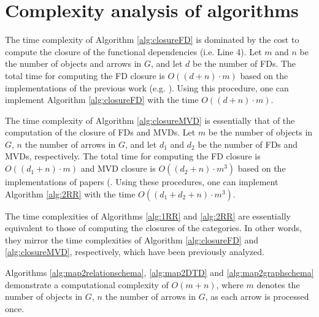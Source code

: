 \section{Complexity analysis of algorithms}
\label{sec:complexity}

The time complexity of Algorithm \ref{alg:closureFD} is dominated by the cost to compute the closure of the functional dependencies (i.e. Line 4). Let $m$ and $n$ be the number of objects and arrows in $G$, and let $d$ be the number of FDs. The total time for computing the FD closure is $O((d+n) \cdot m)$ based on the implementations of the previous work (e.g. \cite{10.1145/320493.320489}). Using this procedure, one can implement Algorithm \ref{alg:closureFD} with the time $O((d+n) \cdot m)$.

The time complexity of Algorithm \ref{alg:closureMVD} is essentially that of the computation of the closure of FDs and MVDs. Let $m$ be the number of objects in $G$, $n$ the number of arrows in $G$, and let $d_1$ and $d_2$ be the number of FDs and MVDs, respectively. The total time for computing the FD closure is $O((d_1+n) \cdot m)$ and MVD closure is $O((d_2+n) \cdot m^3)$ based on the implementations of papers  (\cite{10.1145/320493.320489, 10.1145/320613.320614}. Using these procedures, one can implement Algorithm \ref{alg:2RR} with the time $O((d_1+d_2+n) \cdot m^3)$.

The time complexities of Algorithms \ref{alg:1RR} and \ref{alg:2RR} are essentially equivalent to those of computing the closures of the categories. In other words, they mirror the time complexities of Algorithm \ref{alg:closureFD} and \ref{alg:closureMVD}, respectively, which have been previously analyzed.

Algorithms \ref{alg:map2relationschema}, \ref{alg:map2DTD} and \ref{alg:map2graphschema} demonstrate a computational complexity of $O(m+n)$, where $m$ denotes the number of objects in $G$, $n$ the number of arrows in $G$, as each arrow is processed once.